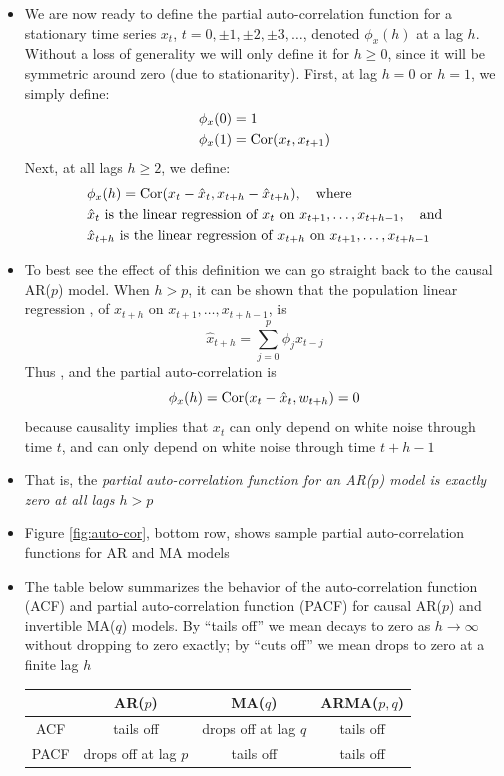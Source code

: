 \documentclass{article}
\begin{document}
\begin{itemize}
\item We are now ready to define the partial auto-correlation function for a
  stationary time series $x_t$, $t = 0, \pm 1, \pm 2, \pm 3, \dots$, denoted
  $\phi_x(h)$ at a lag $h$. Without a loss of generality we will only define it
  for $h \geq 0$, since it will be symmetric around zero (due to stationarity). 
  First, at lag $h=0$ or $h=1$, we simply define: 
  \begin{align*}
  \phi_x(0) &= 1 \\
  \phi_x(1) &= \operatorname{Cor}(x_t, x_{t+1}) 
  \end{align*}
  Next, at all lags $h \geq 2$, we define: 
  \begin{align*}
  &\phi_x(h) = \operatorname{Cor}(x_t - \hat{x}_t, x_{t+h} - \hat{x}_{t+h}), \quad
    \text{where} \\ 
  &\text{$\hat{x}_t$ is the linear regression of $x_t$ on
    $x_{t+1},\dots,x_{t+h-1}$}, \quad \text{and} \\ 
  &\text{$\hat{x}_{t+h}$ is the linear regression of $x_{t+h}$ on 
    $x_{t+1},\dots,x_{t+h-1}$}  
  \end{align*}

\item To best see the effect of this definition we can go straight back to the
  causal AR($p$) model. When $h>p$, it can be shown that the population linear 
  regression , of $x_{t+h}$ on $x_{t+1},\dots,x_{t+h-1}$, 
  is 
  \[
  \hat{x}_{t+h} = \sum_{j=0}^p \phi_j x_{t-j}
  \]
  Thus , and the partial auto-correlation is
  \[
  \phi_x(h) = \operatorname{Cor}(x_t - \hat{x}_t, w_{t+h}) = 0
  \]
  because causality implies that $x_t$ can only depend on white noise through
  time $t$, and  can only depend on white noise through time
  $t+h-1$ 

\item That is, the \emph{partial auto-correlation function for an AR($p$) model
  is exactly zero at all lags $h > p$}

\item Figure \ref{fig:auto-cor}, bottom row, shows sample partial
  auto-correlation functions for AR and MA models

\item The table below summarizes the behavior of the auto-correlation function
  (ACF) and partial auto-correlation function (PACF) for causal AR($p$) and
  invertible MA($q$) models. By ``tails off'' we mean decays to zero as $h \to
  \infty$ without dropping to zero exactly; by ``cuts off'' we mean drops to
  zero at a finite lag $h$
  \begin{center} \smallskip
  \begin{tabular}{|c|c|c|c|}
  \hline
  & AR($p$) & MA($q$) & ARMA($p,q$) \\
  \hline
  ACF & tails off & drops off at lag $q$ & tails off \\
  \hline
  PACF & drops off at lag $p$ & tails off & tails off \\
  \hline
  \end{tabular} \smallskip
  \end{center}


\end{itemize}
\end{document}
